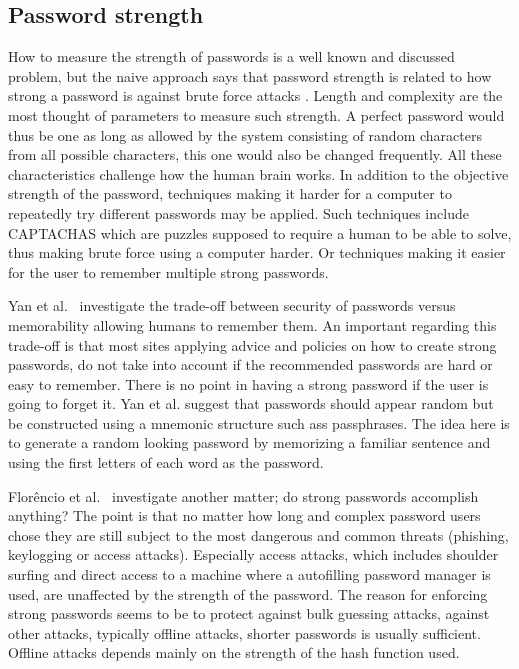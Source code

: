 \subsection{Password strength}\label{password-strength}
How to measure the strength of passwords is a well known and discussed problem, but the naive approach says that password strength is related to how strong a password is against brute force attacks \cite{password-strength}. Length and complexity are the most thought of parameters to measure such strength. A perfect password would thus be one as long as allowed by the system consisting of random characters from all possible characters, this one would also be changed frequently. All these characteristics challenge how the human brain works. In addition to the objective strength of the password, techniques making it harder for a computer to repeatedly try different passwords may be applied. Such techniques include CAPTACHAS \cite{captcha} which are puzzles supposed to require a human to be able to solve, thus making brute force using a computer harder. Or techniques making it easier for the user to remember multiple strong passwords.
\par Yan et al.~\cite{memorability_yan} investigate the trade-off between security of passwords versus memorability allowing humans to remember them. An important regarding this trade-off is that most sites applying advice and policies on how to create strong passwords, do not take into account if the recommended passwords are hard or easy to remember. There is no point in having a strong password if the user is going to forget it. Yan et al. suggest that passwords should appear random but be constructed using a  mnemonic structure such ass passphrases. The idea here is to generate a random looking password by memorizing a familiar sentence and using the first letters of each word as the password. 
\par Florêncio et al.~\cite{strong-pws_florencio} investigate another matter; do strong passwords accomplish anything? The point is that no matter how long and complex password users chose they are still subject to the most dangerous and common threats (phishing, keylogging or access attacks). Especially access attacks, which includes shoulder surfing and direct access to a machine where a autofilling password manager is used, are unaffected by the strength of the password.  The reason for enforcing strong passwords seems to be to protect against bulk guessing attacks, against other attacks, typically offline attacks, shorter passwords is usually sufficient. Offline attacks depends mainly on the strength of the hash function used.

